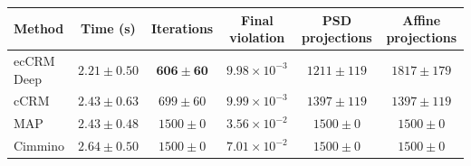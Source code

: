 \begin{tabular}{lccccc}
\toprule
Method & Time (s) & Iterations & Final violation & PSD projections & Affine projections \\
\midrule
ecCRM Deep & $\mathbf{2.21 \pm 0.50}$ & $\mathbf{606 \pm 60}$ & $9.98 \times 10^{-3}$ & $1211 \pm 119$ & $1817 \pm 179$ \\
cCRM & $2.43 \pm 0.63$ & $699 \pm 60$ & $9.99 \times 10^{-3}$ & $1397 \pm 119$ & $1397 \pm 119$ \\
MAP & $2.43 \pm 0.48$ & $1500 \pm 0$ & $3.56 \times 10^{-2}$ & $1500 \pm 0$ & $1500 \pm 0$ \\
Cimmino & $2.64 \pm 0.50$ & $1500 \pm 0$ & $7.01 \times 10^{-2}$ & $1500 \pm 0$ & $1500 \pm 0$ \\
\bottomrule
\end{tabular}
